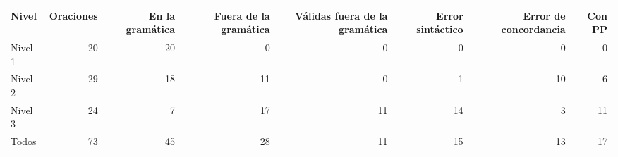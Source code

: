 \begin{tabular}{lrrrrrrr}
\toprule
Nivel & Oraciones & En la gramática & Fuera de la gramática & Válidas fuera de la gramática & Error sintáctico & Error de concordancia & Con PP \\
\midrule
Nivel 1 & 20 & 20 & 0 & 0 & 0 & 0 & 0 \\
Nivel 2 & 29 & 18 & 11 & 0 & 1 & 10 & 6 \\
Nivel 3 & 24 & 7 & 17 & 11 & 14 & 3 & 11 \\
Todos & 73 & 45 & 28 & 11 & 15 & 13 & 17 \\
\bottomrule
\end{tabular}
